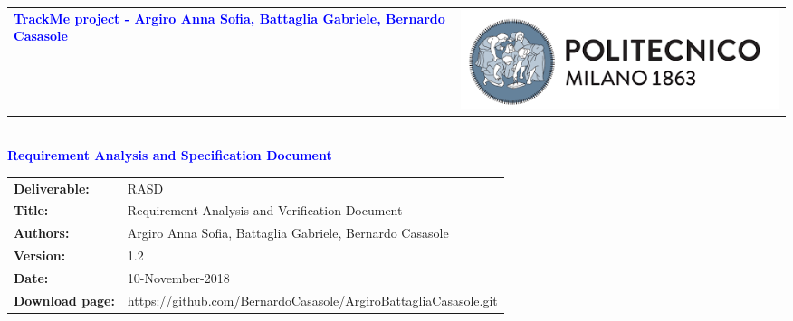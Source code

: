 




\begin{titlepage}


{\begin{table}[t!]
\centering
\begin{tabu} to \textwidth { X[1.3,r,p] X[1.7,l,p] }
\textcolor{Blue}{\textbf{\small{TrackMe project - Argiro Anna Sofia, Battaglia Gabriele, Bernardo Casasole}}} & \includegraphics[scale=0.5]{images/PolimiLogo}
\end{tabu}
\end{table}}~\\ [7cm]


\centering
{\textcolor{Blue}{\textbf{\Huge{Requirement Analysis and Specification Document}}}} \\ [1cm]

\end{titlepage}

\begin{table}[h!]
\begin{tabu} to \textwidth { X[0.3,r,p] X[0.7,l,p] }
\hline

\textbf{Deliverable:} & RASD\\
\textbf{Title:} & Requirement Analysis and Verification Document \\
\textbf{Authors:} & Argiro Anna Sofia, Battaglia Gabriele, Bernardo Casasole \\
\textbf{Version:} & 1.2 \\ 
\textbf{Date:} & 10-November-2018 \\
\textbf{Download page:} & https://github.com/BernardoCasasole/ArgiroBattagliaCasasole.git \\
\hline
\end{tabu}
\end{table}

\setcounter{page}{2}

\newpage
{}
\tableofcontents

